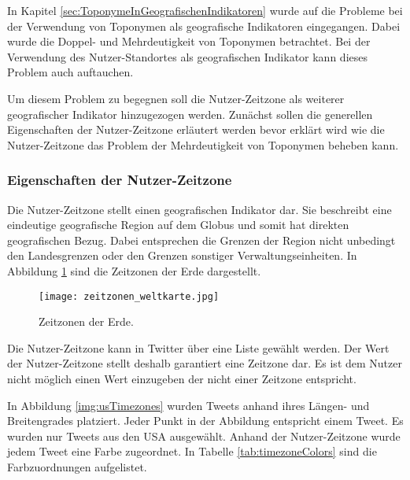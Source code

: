 			In Kapitel \ref{sec:ToponymeInGeografischenIndikatoren} wurde auf die Probleme bei der Verwendung von Toponymen als geografische Indikatoren eingegangen.
			Dabei wurde die Doppel- und Mehrdeutigkeit von Toponymen betrachtet.
			Bei der Verwendung des Nutzer-Standortes als geografischen Indikator kann dieses Problem auch auftauchen. 

			Um diesem Problem zu begegnen soll die Nutzer-Zeitzone als weiterer geografischer Indikator hinzugezogen werden.
			Zunächst sollen die generellen Eigenschaften der Nutzer-Zeitzone erläutert werden bevor erklärt wird wie die Nutzer-Zeitzone das Problem der Mehrdeutigkeit von Toponymen beheben kann.

			\subsubsection{Eigenschaften der Nutzer-Zeitzone}

				Die Nutzer-Zeitzone stellt einen geografischen Indikator dar.
				Sie beschreibt eine eindeutige geografische Region auf dem Globus und somit hat direkten geografischen Bezug.
				Dabei entsprechen die Grenzen der Region nicht unbedingt den Landesgrenzen oder den Grenzen sonstiger Verwaltungseinheiten. 
				In Abbildung \ref{img:timezones} sind die Zeitzonen der Erde dargestellt.

				\begin{figure}[!ht]
					\begin{center}
						\texttt{[image: zeitzonen\_weltkarte.jpg]}
						\caption{Zeitzonen der Erde.}
						\label{img:timezones}
					\end{center}
				\end{figure}	

				Die Nutzer-Zeitzone kann in Twitter über eine Liste gewählt werden.
				Der Wert der Nutzer-Zeitzone stellt deshalb garantiert eine Zeitzone dar.
				Es ist dem Nutzer nicht möglich einen Wert einzugeben der nicht einer Zeitzone entspricht.

				In Abbildung \ref{img:usTimezones} wurden Tweets anhand ihres Längen- und Breitengrades platziert.
				Jeder Punkt in der Abbildung entspricht einem Tweet.
				Es wurden nur Tweets aus den USA ausgewählt.
				Anhand der Nutzer-Zeitzone wurde jedem Tweet eine Farbe zugeordnet.
				In Tabelle \ref{tab:timezoneColors} sind die Farbzuordnungen aufgelistet. 

